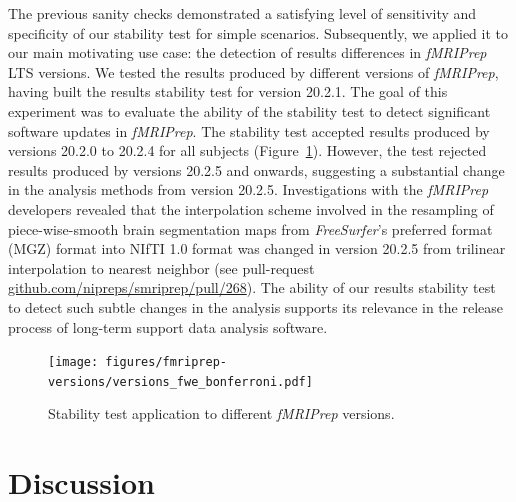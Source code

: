 \documentclass[lettersize,journal]{IEEEtran}
\newcommand{\fmriprep}{\emph{fMRIPrep}\xspace}
\begin{document}
{The previous sanity checks demonstrated a satisfying level of sensitivity and specificity of our stability test for simple scenarios. Subsequently, we applied it to our main motivating use case: the detection of results differences in \fmriprep LTS versions. We tested the results produced by different versions of \fmriprep, having built the results stability test for version 20.2.1. The goal of this experiment was to evaluate the ability of the stability test to detect significant software updates in \fmriprep. The stability test accepted results produced by versions 20.2.0 to 20.2.4 for all subjects (Figure~\ref{fig:version_bonferroni}). However, the test rejected results produced by versions 20.2.5 and onwards, suggesting a substantial change in the analysis methods from version 20.2.5. Investigations with the \fmriprep developers revealed that the interpolation scheme involved in the resampling of piece-wise-smooth brain segmentation maps from \emph{FreeSurfer}'s preferred format (MGZ) format into NIfTI 1.0 format was changed in version {20.2.5} from trilinear interpolation to nearest neighbor (see pull-request \href{https://github.com/nipreps/smriprep/pull/268}{\url{github.com/nipreps/smriprep/pull/268}}). The ability of our results stability test to detect such subtle changes in the analysis supports its relevance in the release process of long-term support data analysis software.

\begin{figure}
  \centering
  \texttt{[image: figures/fmriprep-versions/versions\_fwe\_bonferroni.pdf]}
  \caption{Stability test application to different \fmriprep versions.}
  \label{fig:version_bonferroni}
\end{figure}


\section{Discussion}


}
\end{document}
